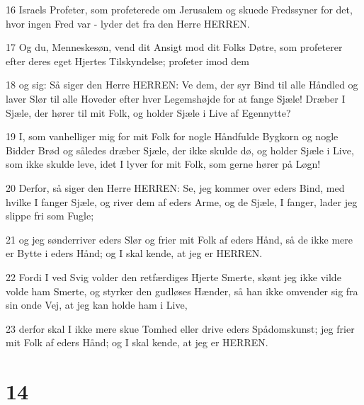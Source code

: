 \par 16 Israels Profeter, som profeterede om Jerusalem og skuede Fredssyner for det, hvor ingen Fred var - lyder det fra den Herre HERREN.
\par 17 Og du, Menneskesøn, vend dit Ansigt mod dit Folks Døtre, som profeterer efter deres eget Hjertes Tilskyndelse; profeter imod dem
\par 18 og sig: Så siger den Herre HERREN: Ve dem, der syr Bind til alle Håndled og laver Slør til alle Hoveder efter hver Legemshøjde for at fange Sjæle! Dræber I Sjæle, der hører til mit Folk, og holder Sjæle i Live af Egennytte?
\par 19 I, som vanhelliger mig for mit Folk for nogle Håndfulde Bygkorn og nogle Bidder Brød og således dræber Sjæle, der ikke skulde dø, og holder Sjæle i Live, som ikke skulde leve, idet I lyver for mit Folk, som gerne hører på Løgn!
\par 20 Derfor, så siger den Herre HERREN: Se, jeg kommer over eders Bind, med hvilke I fanger Sjæle, og river dem af eders Arme, og de Sjæle, I fanger, lader jeg slippe fri som Fugle;
\par 21 og jeg sønderriver eders Slør og frier mit Folk af eders Hånd, så de ikke mere er Bytte i eders Hånd; og I skal kende, at jeg er HERREN.
\par 22 Fordi I ved Svig volder den retfærdiges Hjerte Smerte, skønt jeg ikke vilde volde ham Smerte, og styrker den gudløses Hænder, så han ikke omvender sig fra sin onde Vej, at jeg kan holde ham i Live,
\par 23 derfor skal I ikke mere skue Tomhed eller drive eders Spådomskunst; jeg frier mit Folk af eders Hånd; og I skal kende, at jeg er HERREN.

\chapter{14}

